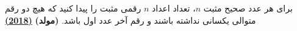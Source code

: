 برای هر عدد صحیح مثبت $n$، تعداد اعداد $n$ رقمی مثبت را پیدا کنید که 
هیچ دو رقم متوالی یکسانی نداشته باشند و رقم آخر عدد اول باشد.
\textbf{(مولد)}
\href{https://artofproblemsolving.com/community/c5h1629599p10226138}{\textbf{(2018)}}
